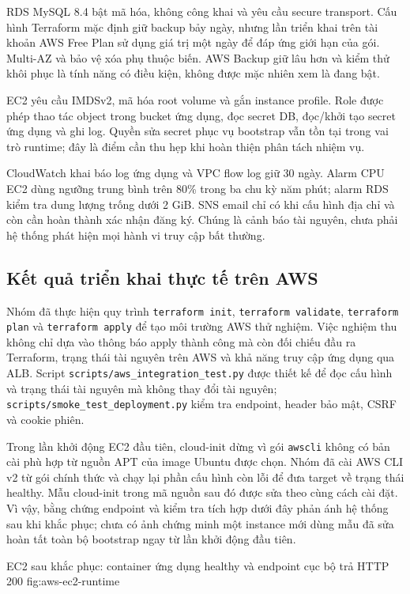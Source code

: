 RDS MySQL 8.4 bật mã hóa, không công khai và yêu cầu secure transport. Cấu hình Terraform mặc định giữ backup bảy ngày, nhưng lần triển khai trên tài khoản AWS Free Plan sử dụng giá trị một ngày để đáp ứng giới hạn của gói. Multi-AZ và bảo vệ xóa phụ thuộc biến. AWS Backup giữ lâu hơn và kiểm thử khôi phục là tính năng có điều kiện, không được mặc nhiên xem là đang bật.

EC2 yêu cầu IMDSv2, mã hóa root volume và gắn instance profile. Role được phép thao tác object trong bucket ứng dụng, đọc secret DB, đọc/khởi tạo secret ứng dụng và ghi log. Quyền sửa secret phục vụ bootstrap vẫn tồn tại trong vai trò runtime; đây là điểm cần thu hẹp khi hoàn thiện phân tách nhiệm vụ.

CloudWatch khai báo log ứng dụng và VPC flow log giữ 30 ngày. Alarm CPU EC2 dùng ngưỡng trung bình trên 80\% trong ba chu kỳ năm phút; alarm RDS kiểm tra dung lượng trống dưới 2 GiB. SNS email chỉ có khi cấu hình địa chỉ và còn cần hoàn thành xác nhận đăng ký. Chúng là cảnh báo tài nguyên, chưa phải hệ thống phát hiện mọi hành vi truy cập bất thường.

\subsection{Kết quả triển khai thực tế trên AWS}
Nhóm đã thực hiện quy trình \texttt{terraform init}, \texttt{terraform validate}, \texttt{terraform plan} và \texttt{terraform apply} để tạo môi trường AWS thử nghiệm. Việc nghiệm thu không chỉ dựa vào thông báo apply thành công mà còn đối chiếu đầu ra Terraform, trạng thái tài nguyên trên AWS và khả năng truy cập ứng dụng qua ALB. Script \texttt{scripts/aws\_integration\_test.py} được thiết kế để đọc cấu hình và trạng thái tài nguyên mà không thay đổi tài nguyên; \texttt{scripts/smoke\_test\_deployment.py} kiểm tra endpoint, header bảo mật, CSRF và cookie phiên.

Trong lần khởi động EC2 đầu tiên, cloud-init dừng vì gói \texttt{awscli} không có bản cài phù hợp từ nguồn APT của image Ubuntu được chọn. Nhóm đã cài AWS CLI v2 từ gói chính thức và chạy lại phần cấu hình còn lỗi để đưa target về trạng thái healthy. Mẫu cloud-init trong mã nguồn sau đó được sửa theo cùng cách cài đặt. Vì vậy, bằng chứng endpoint và kiểm tra tích hợp dưới đây phản ánh hệ thống sau khi khắc phục; chưa có ảnh chứng minh một instance mới dùng mẫu đã sửa hoàn tất toàn bộ bootstrap ngay từ lần khởi động đầu tiên.

{EC2 sau khắc phục: container ứng dụng healthy và endpoint cục bộ trả HTTP 200}
{fig:aws-ec2-runtime}

